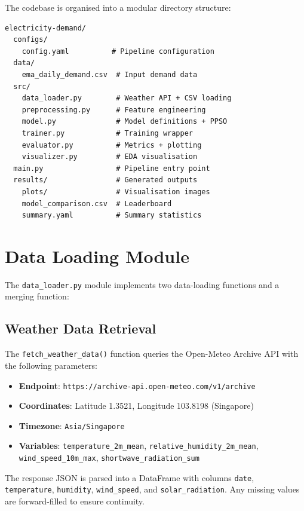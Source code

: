 The codebase is organised into a modular directory structure:

\begin{lstlisting}[language={}, caption={Project directory structure.}, label={lst:project_structure}]
electricity-demand/
  configs/
    config.yaml          # Pipeline configuration
  data/
    ema_daily_demand.csv  # Input demand data
  src/
    data_loader.py        # Weather API + CSV loading
    preprocessing.py      # Feature engineering
    model.py              # Model definitions + PPSO
    trainer.py            # Training wrapper
    evaluator.py          # Metrics + plotting
    visualizer.py         # EDA visualisation
  main.py                 # Pipeline entry point
  results/                # Generated outputs
    plots/                # Visualisation images
    model_comparison.csv  # Leaderboard
    summary.yaml          # Summary statistics
\end{lstlisting}


\section{Data Loading Module}

The \texttt{data\_loader.py} module implements two data-loading functions and a merging function:

\subsection{Weather Data Retrieval}

The \texttt{fetch\_weather\_data()} function queries the Open-Meteo Archive API with the following parameters:
\begin{itemize}
    \item \textbf{Endpoint}: \texttt{https://archive-api.open-meteo.com/v1/archive}
    \item \textbf{Coordinates}: Latitude 1.3521, Longitude 103.8198 (Singapore)
    \item \textbf{Timezone}: \texttt{Asia/Singapore}
    \item \textbf{Variables}: \texttt{temperature\_2m\_mean}, \texttt{relative\_humidity\_2m\_mean}, \texttt{wind\_speed\_10m\_max}, \texttt{shortwave\_radiation\_sum}
\end{itemize}

The response JSON is parsed into a DataFrame with columns \texttt{date}, \texttt{temperature}, \texttt{humidity}, \texttt{wind\_speed}, and \texttt{solar\_radiation}. Any missing values are forward-filled to ensure continuity.

